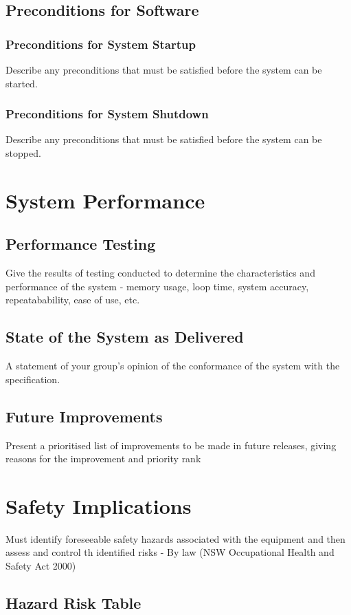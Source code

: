\documentclass[]{report}
\begin{document}
\section{Preconditions for Software}
\subsection{Preconditions for System Startup}
Describe any preconditions that must be satisfied before the system can be started.

\subsection{Preconditions for System Shutdown}
Describe any preconditions that must be satisfied before the system can be stopped.

\chapter{System Performance}
\section{Performance Testing}
Give the results of testing conducted to determine the characteristics and performance of the system - memory usage, loop time, system accuracy, repeatabability, ease of use, etc.

\section{State of the System as Delivered}
A statement of your group's opinion of the conformance of the system with the specification.

\section{Future Improvements}
Present a prioritised list of improvements to be made in future releases, giving reasons for the improvement and priority rank

\chapter{Safety Implications}
Must identify foreseeable safety hazards associated with the equipment and then assess and control th identified risks - By law (NSW Occupational Health and Safety Act 2000)

\section{Hazard Risk Table}
\end{document}
